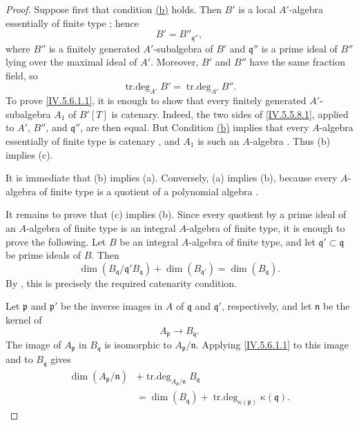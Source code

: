 \begin{proof}
Suppose first that condition
\hyperref[IV.5.6.1.b]{\textup{(b)}} holds.  Then $B'$ is a local
$A'$-algebra essentially of finite type ; hence
\[
B'=B''_{\mathfrak q''},
\]
where $B''$ is a finitely generated $A'$-subalgebra of $B'$ and
$\mathfrak q''$ is a prime ideal of $B''$ lying over the maximal
ideal of $A'$.  Moreover, $B'$ and $B''$ have the same fraction
field, so
\[
\operatorname{tr.deg}_{A'}B'
 =\operatorname{tr.deg}_{A'}B''.
\]
To prove \eqref{IV.5.6.1.1}, it is enough to show that every
finitely generated $A'$-subalgebra $A_1$ of $B'[T]$ is catenary.
Indeed, the two sides of \eqref{IV.5.5.8.1}, applied to $A'$, $B''$,
and $\mathfrak q''$, are then equal.  But
Condition \hyperref[IV.5.6.1.b]{\textup{(b)}} implies that every
$A$-algebra essentially of
finite type is catenary , and $A_1$ is such an
$A$-algebra .  Thus (b) implies (c).

It is immediate that (b) implies (a).  Conversely, (a) implies (b),
because every $A$-algebra of finite type is a quotient of a
polynomial algebra .

It remains to prove that (c) implies (b).  Since every quotient by a
prime ideal of an $A$-algebra of finite type is an integral
$A$-algebra of finite type, it is enough to prove the following.
Let $B$ be an integral $A$-algebra of finite type, and let
$\mathfrak q'\subset\mathfrak q$ be prime ideals of $B$.  Then
\begin{equation}
\dim(B_{\mathfrak q}/\mathfrak q'B_{\mathfrak q})
 +\dim(B_{\mathfrak q'})
 =\dim(B_{\mathfrak q}).
\tag{5.6.1.2}\label{IV.5.6.1.2}
\end{equation}
By , this is precisely the required catenarity
condition.


Let $\mathfrak p$ and $\mathfrak p'$ be the inverse images in $A$ of
$\mathfrak q$ and $\mathfrak q'$, respectively, and let
$\mathfrak n$ be the kernel of
\[
A_{\mathfrak p}\longrightarrow B_{\mathfrak q}.
\]
The image of $A_{\mathfrak p}$ in $B_{\mathfrak q}$ is isomorphic to
$A_{\mathfrak p}/\mathfrak n$.  Applying
\eqref{IV.5.6.1.1} to this image and to $B_{\mathfrak q}$ gives
\begin{equation}
\begin{split}
\dim(A_{\mathfrak p}/\mathfrak n)
 &+\operatorname{tr.deg}_{A_{\mathfrak p}/\mathfrak n}
       B_{\mathfrak q}\\
 &=\dim(B_{\mathfrak q})
   +\operatorname{tr.deg}_{\kappa(\mathfrak p)}
       \kappa(\mathfrak q).
\end{split}
\tag{5.6.1.3}\label{IV.5.6.1.3}
\end{equation}


\end{proof}
